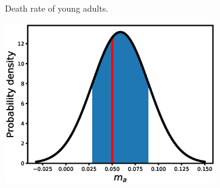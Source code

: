 \documentclass[12pt, table]{article}
\begin{document}
\begin{figure}[H]
\begin{subfigure}[b]{0.45\textwidth}
        \caption{Death rate of  young adults.}
       \label{fig2e}
   \end{subfigure}
   \begin{subfigure}[b]{0.45\textwidth}
       \includegraphics[width=1\textwidth, height=0.24\textheight]{figexple3/fma}
      

\end{subfigure}
\end{figure}
\end{document}
